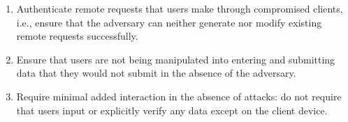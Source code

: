 \begin{enumerate}
	\item Authenticate remote requests that users make through compromised clients, i.e., ensure that the adversary can neither generate nor modify existing remote requests successfully.

	\item Ensure that users are not being manipulated into entering and submitting data that they would not submit in the absence of the adversary.

	\item Require minimal added interaction in the absence of attacks: do not require that users input or explicitly verify any data except on the client device.
\end{enumerate}
